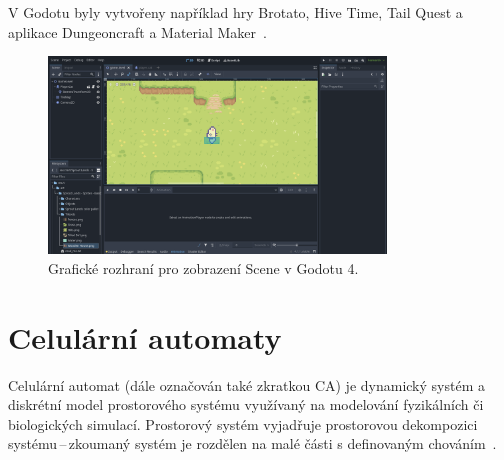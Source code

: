 V Godotu byly vytvořeny například hry Brotato, Hive Time, Tail Quest a aplikace Dungeoncraft a Material Maker~\cite{Godot_Engine}.
\begin{figure}[H]
	\centering
	\includegraphics[width=0.8\textwidth]{obrazky-figures/ch2/godot_view.png}
	\caption{Grafické rozhraní pro zobrazení Scene v Godotu 4.}
	\label{fig:godot_view}
\end{figure}

\section{Celulární automaty}\label{chap:Celulární automaty}
Celulární automat (dále označován také zkratkou CA) je dynamický systém a diskrétní model prostorového systému využívaný na modelování fyzikálních či biologických simulací. Prostorový systém vyjadřuje prostorovou dekompozici systému\,--\,zkoumaný systém je rozdělen na malé části s definovaným chováním~\cite{ims}.

